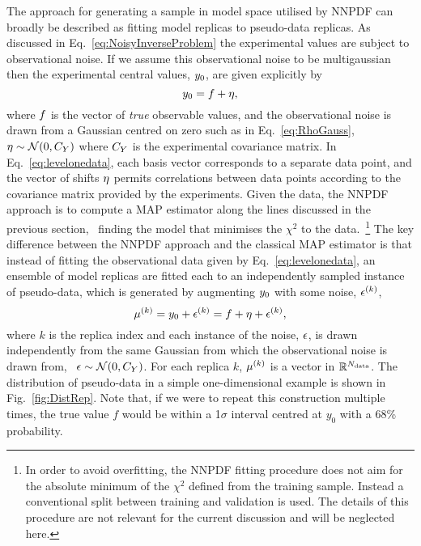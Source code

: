 The approach for generating a sample in model space utilised by NNPDF can
broadly be described as fitting model replicas to pseudo-data replicas. As
discussed in Eq.~\ref{eq:NoisyInverseProblem} the experimental values are
subject to observational noise. If we assume this observational noise to be
multigaussian then the experimental central values, $y_0$, are given
explicitly by
\begin{equation}
    \label{eq:levelonedata}
    y_0 = f + \eta,
\end{equation}
where $f$ is the vector of {\em true} observable values, and the
observational noise is drawn from a Gaussian centred on zero such as in
Eq.~\ref{eq:RhoGauss}, \ie\ $\eta \sim \mathcal{N}(0, C_{Y})$ where
$C_{Y}$ is the experimental covariance matrix. In
Eq.~\ref{eq:levelonedata}, each basis vector corresponds to a separate data
point, and the vector of shifts $\eta$ permits correlations between data
points according to the covariance matrix provided by the experiments. Given the
data, the NNPDF approach is to compute a MAP estimator along the lines discussed
in the previous section, \ie\ finding the model that minimises the $\chi^2$ to
the data.~\footnote{In order to avoid overfitting, the NNPDF fitting procedure does 
not aim for the absolute minimum of the $\chi^2$ defined from the training sample. 
Instead a conventional split between training and validation is used. The details 
of this procedure are not relevant for the current discussion and will be neglected here.} 
The key difference between the NNPDF approach and the classical MAP
estimator is that instead of fitting the observational data given by
Eq.~\ref{eq:levelonedata}, an ensemble of model replicas are fitted each to an
independently sampled instance of pseudo-data, which is generated by augmenting
$y_0$ with some noise, $\epsilon^{(k)}$,
\begin{equation}
    \label{eq:leveltwodata1}
    \mu^{(k)} = y_0 + \epsilon^{(k)}
    = f + \eta + \epsilon^{(k)},
\end{equation}
where $k$ is the replica index and each instance of the noise, $\epsilon$, is
drawn independently from the same Gaussian from which the observational noise is
drawn from, \ie\ $\epsilon \sim \mathcal{N}(0, C_{Y})$. For each replica
$k$, $\mu^{(k)}$ is a vector in $\mathbb{R}^{N_{\rm data}}$. The distribution of
pseudo-data in a simple one-dimensional example is shown in
Fig.~\ref{fig:DistRep}. Note that, if we were to repeat this construction
multiple times, the true value $f$ would be within a 1$\sigma$ interval centred
at $y_0$ with a 68\% probability.


